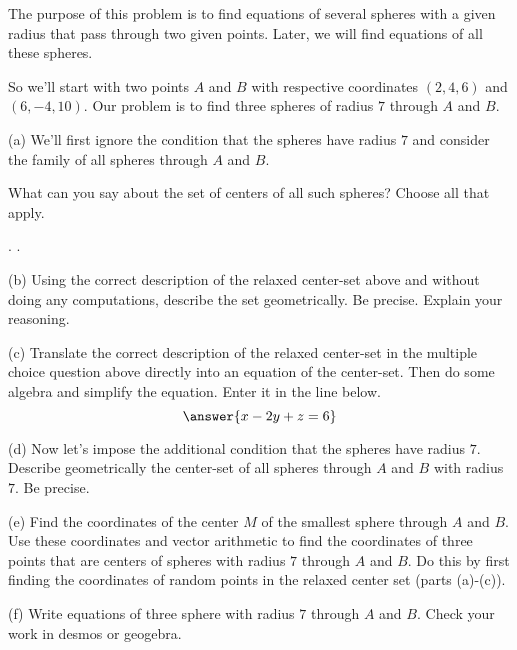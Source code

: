 \documentclass{ximera}
\begin{document}
\begin{question} \label{Q5sdf04r:Vectors}
The purpose of this problem is to find equations of several spheres with a given radius that pass through two given points. Later, we will find equations of all these spheres.

So we'll start with two points $A$ and $B$ with respective coordinates $(2,4,6)$ and $(6,-4,10)$. Our problem is to find three spheres of radius $7$ through $A$ and $B$.

(a) We'll first ignore the condition that the spheres have radius $7$ and consider the family of all spheres through $A$ and $B$.

What can you say about the set of centers of all such spheres? Choose all that apply.
\begin{selectAll}
.
.
\end{selectAll}


 (b) Using the correct description of the relaxed center-set above and without doing any computations, describe the set geometrically. Be precise. Explain your reasoning.

(c) Translate the correct description of the relaxed center-set in the multiple choice question above directly into an equation of the center-set. Then do some algebra and simplify the equation. Enter it in the line below.
\[
     \answer{x-2y+z=6}
\]

(d) Now let's impose the additional condition that the spheres have radius $7$. Describe geometrically the center-set of all spheres through $A$ and $B$ with radius $7$. Be precise.

(e) Find the coordinates of the center $M$ of the smallest sphere through $A$ and $B$. Use these coordinates and vector arithmetic to find the coordinates of three points that are centers of spheres with radius $7$ through $A$ and $B$. Do this by first finding the coordinates of random points in the relaxed center set (parts (a)-(c)). 

(f) Write equations of three sphere with radius $7$ through $A$ and $B$. Check your work in desmos or geogebra.

\end{question}
\end{document}
